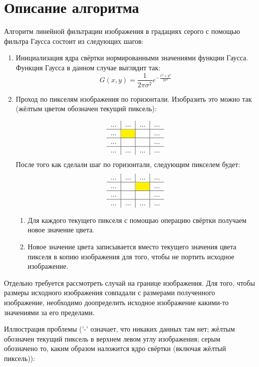 \documentclass{report}
\begin{document}
\section*{Описание алгоритма}
\par Алгоритм линейной фильтрации изображения в градациях серого с помощью фильтра Гаусса состоит из следующих шагов:
\begin{enumerate}
\item Инициализация ядра свёртки нормированными значениями функции Гаусса. Функция Гаусса в данном случае выглядит так: $$G(x,y) = \frac{1}{2 \pi \sigma^2}e^{-\frac{x^2+y^2}{2 \sigma^2}}$$
\item Проход по пикселям изображения по горизонтали. Изобразить это можно так (жёлтым цветом обозначен текущий пиксель):

$$\begin{tabular}{c|c|c|c}
...  & ...  & ... & ... \\
\hline
... & \cellcolor{yellow}&  & ...  \\
\hline
... &  &  & ... \\
\hline
...  & ...  & ... & ... \\
\end{tabular}$$
После того как сделали шаг по горизонтали, следующим пикселем будет:
$$ \begin{tabular}{c|c|c|c}
	...  & ...  & ... & ... \\
	\hline
	... & & \cellcolor{yellow} & ...  \\
	\hline
	... &  &  & ... \\
	\hline
	...  & ...  & ... & ... \\
\end{tabular}$$
    \begin{enumerate}
    \item Для каждого текущего пикселя с помощью операцию свёртки получаем новое значение цвета.
    \item Новое значение цвета записывается вместо текущего значения цвета пикселя в копию изображения для того, чтобы не портить исходное изображение.
    \end{enumerate}
\end{enumerate}
\par Отдельно требуется рассмотреть случай на границе изображения. Для того, чтобы размеры исходного изображения совпадали с размерами полученного изображение, необходимо доопределить исходное изображение какими-то значениями за его пределами.
\par Иллюстрация проблемы ('-' означает, что никаких данных там нет; жёлтым обозначен текущий пиксель в верхнем левом углу изображения; серым обозначено то, каким образом наложится ядро свёртки (включая жёлтый пиксель)):
\end{document}
